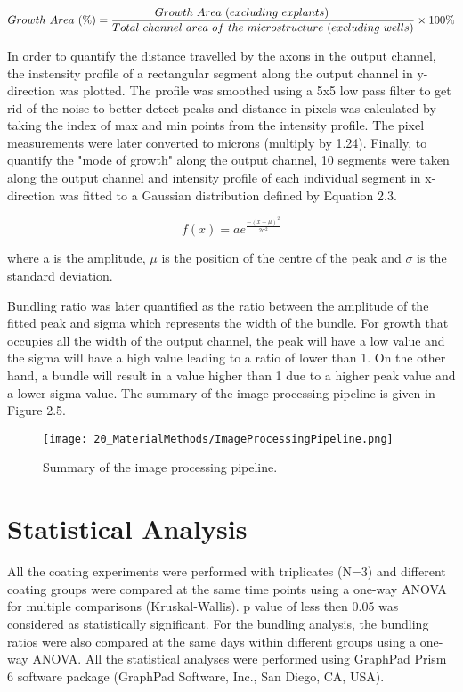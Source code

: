 \documentclass{book}
\begin{document}
\begin{equation}
Growth\ Area\ (\%)\ \\ = \frac{Growth\ Area\ (excluding\ explants)\ \\}{Total\ channel\ area\ of\ the\ microstructure\ (excluding\ wells) \\} \times 100\% 
\end{equation}

In order to quantify the distance travelled by the axons in the output channel, the instensity profile of a rectangular segment along the output channel in y-direction was plotted. The profile was smoothed using a 5x5 low pass filter to get rid of the noise to better detect peaks and distance in pixels was calculated by taking the index of max and min points from the intensity profile. The pixel measurements were later converted to microns (multiply by 1.24). Finally, to quantify the "mode of growth" along the output channel, 10 segments were taken along the output channel and intensity profile of each individual segment in x-direction was fitted to a Gaussian distribution defined by Equation 2.3.


\begin{equation}
 f(x) = ae^{\frac{-(x-\mu)^2}{2 \sigma^2}}
\end{equation}

where a is the amplitude, $\mu$ is the position of the centre of the peak and $\sigma$ is the standard deviation.

Bundling ratio was later quantified as the ratio between the amplitude of the fitted peak and sigma which represents the width of the bundle. For growth that occupies all the width of the output channel, the peak will have a low value and the sigma will have a high value leading to a ratio of lower than 1. On the other hand, a bundle will result in a value higher than 1 due to a higher peak value and a lower sigma value. The summary of the image processing pipeline is given in Figure 2.5.

\begin{figure}[H]
\centering
\texttt{[image: 20\_MaterialMethods/ImageProcessingPipeline.png]} 
\caption{Summary of the image processing pipeline.}
\label{fig:Image Processing Pipeline}
\end{figure} 

\section{Statistical Analysis}
All the coating experiments were performed with triplicates (N=3) and different coating groups were compared at the same time points using a one-way ANOVA for multiple comparisons (Kruskal-Wallis). p value of less then 0.05 was considered as statistically significant. For the bundling analysis, the bundling ratios were also compared at the same days within different groups using a one-way ANOVA. All the statistical analyses were performed using GraphPad Prism 6 software package (GraphPad Software, Inc., San Diego, CA, USA).
\end{document}
